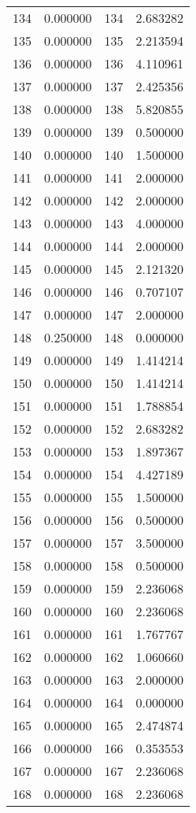 \documentclass[12pt]{article}
\begin{document}
\begin{longtable}{@{}cccc@{}}
134 & 0.000000 & 134 & 2.683282 \\
135 & 0.000000 & 135 & 2.213594 \\
136 & 0.000000 & 136 & 4.110961 \\
137 & 0.000000 & 137 & 2.425356 \\
138 & 0.000000 & 138 & 5.820855 \\
139 & 0.000000 & 139 & 0.500000 \\
140 & 0.000000 & 140 & 1.500000 \\
141 & 0.000000 & 141 & 2.000000 \\
142 & 0.000000 & 142 & 2.000000 \\
143 & 0.000000 & 143 & 4.000000 \\
144 & 0.000000 & 144 & 2.000000 \\
145 & 0.000000 & 145 & 2.121320 \\
146 & 0.000000 & 146 & 0.707107 \\
147 & 0.000000 & 147 & 2.000000 \\
148 & 0.250000 & 148 & 0.000000 \\
149 & 0.000000 & 149 & 1.414214 \\
150 & 0.000000 & 150 & 1.414214 \\
151 & 0.000000 & 151 & 1.788854 \\
152 & 0.000000 & 152 & 2.683282 \\
153 & 0.000000 & 153 & 1.897367 \\
154 & 0.000000 & 154 & 4.427189 \\
155 & 0.000000 & 155 & 1.500000 \\
156 & 0.000000 & 156 & 0.500000 \\
157 & 0.000000 & 157 & 3.500000 \\
158 & 0.000000 & 158 & 0.500000 \\
159 & 0.000000 & 159 & 2.236068 \\
160 & 0.000000 & 160 & 2.236068 \\
161 & 0.000000 & 161 & 1.767767 \\
162 & 0.000000 & 162 & 1.060660 \\
163 & 0.000000 & 163 & 2.000000 \\
164 & 0.000000 & 164 & 0.000000 \\
165 & 0.000000 & 165 & 2.474874 \\
166 & 0.000000 & 166 & 0.353553 \\
167 & 0.000000 & 167 & 2.236068 \\
168 & 0.000000 & 168 & 2.236068 \\

\end{longtable}
\end{document}
